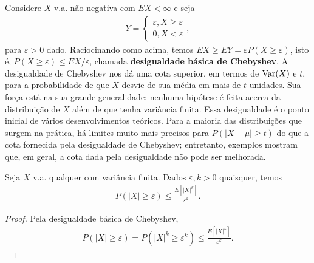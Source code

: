 \documentclass[../Notas.tex]{subfiles}
\begin{document}
\begin{remark}
Considere $X$ v.a. não negativa com $EX < \infty$ e seja
\begin{align*}
    Y = \begin{cases}
    \varepsilon, X\geq\varepsilon \\
    0, X < \varepsilon
    \end{cases},
\end{align*}
para $\varepsilon > 0$ dado. Raciocinando como acima, temos $EX\geq EY = \varepsilon P(X\geq\varepsilon)$, isto é, $P(X\geq\varepsilon) \leq EX/\varepsilon$, chamada \textbf{desigualdade básica de Chebyshev}. A desigualdade de Chebyshev nos dá uma cota superior, em termos de $\text{Var}(X)$ e $t$, para a probabilidade de que $X$ desvie de sua média em mais de $t$ unidades. Sua força está na sua grande generalidade: nenhuma hipótese é feita acerca da distribuição de $X$ além de que tenha variância finita. Essa desigualdade é o ponto inicial de vários desenvolvimentos teóricos. Para a maioria das distribuições que surgem na prática, há limites muito mais precisos para $P(|X-\mu|\geq t)$ do que a cota fornecida pela desigualdade de Chebyshev; entretanto, exemplos mostram que, em geral, a cota dada pela desigualdade não pode ser melhorada.
\end{remark}

\begin{proposition}
Seja $X$ v.a. qualquer com variância finita. Dados $\varepsilon, k > 0$ quaisquer, temos
\begin{align*}
    P(|X|\geq\varepsilon) \leq \frac{E[|X|^k]}{\varepsilon^k}.
\end{align*}
\end{proposition}

\begin{proof}
Pela desigualdade básica de Chebyshev, 
\begin{align*}
    P(|X|\geq\varepsilon) = P(|X|^k\geq \varepsilon^k) \leq\frac{E[|X|^k]}{\varepsilon^k}.
\end{align*}
\end{proof}
\end{document}
